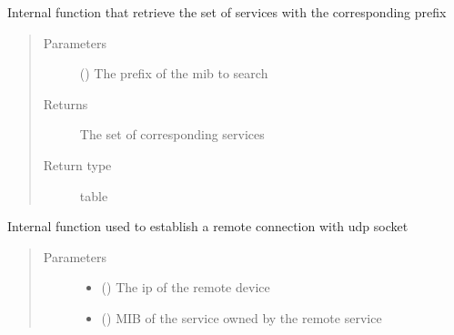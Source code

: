 \documentclass[a4paper,10pt,english,openany,oneside]{sphinxmanual}
\begin{document}
\begin{fulllineitems}
\begin{fulllineitems}
\begin{quote}
\begin{description}
\end{description}\end{quote}

\end{fulllineitems}


\begin{fulllineitems}
\label{\detokenize{code:Share.find}}
Internal function that retrieve the set of services with the corresponding prefix
\begin{quote}\begin{description}
\item[{Parameters}] \leavevmode
{} () \textendash{} The prefix of the mib to search

\item[{Returns}] \leavevmode
The set of corresponding services

\item[{Return type}] \leavevmode
table

\end{description}\end{quote}

\end{fulllineitems}


\begin{fulllineitems}
\label{\detokenize{code:Share.open_udp_socket}}
Internal function used to establish a remote connection with udp socket
\begin{quote}\begin{description}
\item[{Parameters}] \leavevmode\begin{itemize}
\item {} 
 () \textendash{} The ip of the remote device

\item {} 
 () \textendash{} MIB of the service owned by the remote service


\end{itemize}
\end{description}
\end{quote}
\end{fulllineitems}
\end{fulllineitems}
\end{document}
